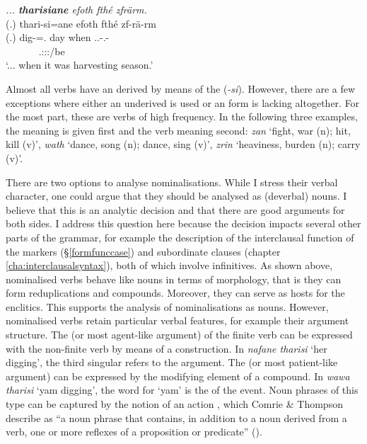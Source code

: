 \begin{exe}
	\ex \textit{... \textbf{tharisiane} efoth fthé zfrärm.}\\
	\glll (.) thari-si=ane efoth fthé zf-rä-rm\\
	(.) dig-{\Nmlz}=\Poss.{\Sg} day when \Tsg.\F.\Betatwo-\Cop.\Ndu-\Dur\\
	~ ~ ~ ~ {\footnotesize \Tsg.\F:\Sbj:\Pst:\Dur/be}\\
	\trans `... when it was harvesting season.' 
	\label{ex011}
\end{exe}

Almost all verbs have an  derived by means of the  (\emph{-si}). However, there are a few exceptions where either an underived  is used or an  form is lacking altogether. For the most part, these are verbs of high frequency. In the following three examples, the  meaning is given first and the verb meaning second: \emph{zan} `fight, war (n); hit, kill (v)', \emph{wath} `dance, song (n); dance, sing (v)', \emph{zrin} `heaviness, burden (n); carry (v)'.

There are two options to analyse nominalisations. While I stress their verbal character, one could argue that they should be analysed as (deverbal) nouns. I believe that this is an analytic decision and that there are good arguments for both sides. I address this question here because the decision impacts several other parts of the grammar, for example the description of the interclausal function of the  markers (\S\ref{formfunccase}) and subordinate clauses (chapter \ref{cha:interclausalsyntax}), both of which involve infinitives. As shown above, nominalised verbs behave like nouns in terms of morphology, that is they can form reduplications and  compounds. Moreover, they can serve as hosts for the  enclitics. This supports the analysis of nominalisations as nouns. However, nominalised verbs retain particular verbal features, for example their argument structure. The  (or most agent-like argument) of the finite verb can be expressed with the non-finite verb by means of a  construction. In \emph{nafane tharisi} `her digging', the third singular  refers to the  argument. The  (or most patient-like argument) can be expressed by the modifying element of a  compound. In \emph{wawa tharisi} `yam digging', the word for `yam' is the  of the event. Noun phrases of this type can be captured by the notion of an action , which Comrie \& Thompson describe as ``a noun phrase that contains, in addition to a noun derived from a verb, one or more reflexes of a proposition or predicate'' (\citeyear[343]{Comrie:2007nom}).

